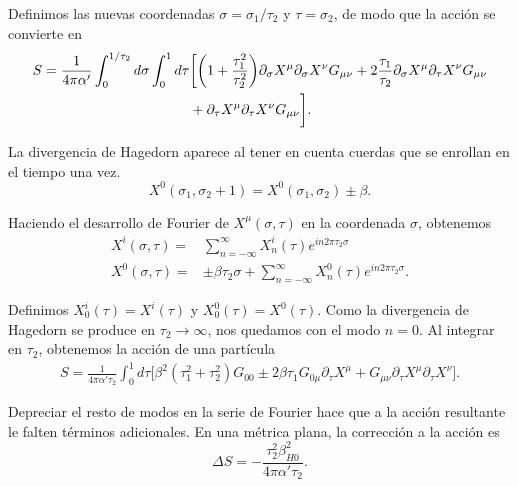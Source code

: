 Definimos las nuevas coordenadas $\sigma=\sigma_1/\tau_2$ y $\tau=\sigma_2$, de modo 
que la acción se convierte en 
\begin{equation}
  \begin{aligned}
    S= \frac{1}{4\pi \alpha'}\int_0^{1/\tau_2} d\sigma  \int_0^1 d\tau 
    &\biggl[
      \qty(1+\frac{\tau_1^2}{\tau^2_2})\partial_\sigma X^\mu \partial_\sigma X^\nu G_{\mu\nu} +
      2\frac{\tau_1}{\tau_2}\partial_\sigma X^\mu \partial_\tau X^\nu G_{\mu\nu}  \\
      &+ \partial_\tau X^\mu \partial_\tau X^\nu G_{\mu\nu}\biggl].
  \end{aligned}
\end{equation}

La divergencia de Hagedorn aparece al tener en cuenta cuerdas que se enrollan en el tiempo una
vez.
\begin{equation}
  X^0(\sigma_1,\sigma_2+1) = X^0(\sigma_1,\sigma_2)\pm \beta.
\end{equation}

Haciendo el desarrollo de Fourier de $X^\mu(\sigma,\tau)$ en la coordenada $\sigma$, obtenemos
\begin{equation}
  \begin{aligned}
    X^i(\sigma,\tau) =& \sum_{n=-\infty}^\infty X_n^i(\tau) e^{in2\pi \tau_2 \sigma} \\
    X^0(\sigma,\tau) =& \pm \beta \tau_2 \sigma +  \sum_{n=-\infty}^\infty X_n^0(\tau) e^{in2\pi \tau_2 \sigma}.
  \end{aligned}
\end{equation}

Definimos $X^i_0(\tau)=X^i(\tau)$ y $X_0^0(\tau)=X^0(\tau)$.
Como la divergencia de Hagedorn se produce en $\tau_2\to\infty$, nos quedamos con el modo $n=0$.
Al integrar en $\tau_2$, obtenemos la acción de una partícula
\begin{equation}
  \begin{aligned}
    S=\frac{1}{4\pi\alpha'\tau_2}\int_0^1 d\tau \big[
      \beta^2 (\tau_1^2+\tau_2^2)G_{00} \pm 2\beta\tau_1 G_{0\mu}\partial_\tau X^\mu  +G_{\mu\nu} \partial_\tau X^\mu \partial_\tau X^\nu
    \big].
  \end{aligned}
\end{equation}

Depreciar el resto de modos en la serie de Fourier hace que a la acción resultante le falten
términos adicionales. 
En una métrica plana, la corrección a la acción es
\begin{equation}
  \Delta S = - \frac{\tau_2^2 \beta^2_{H0}}{4\pi\alpha' \tau_2}.
\end{equation}

